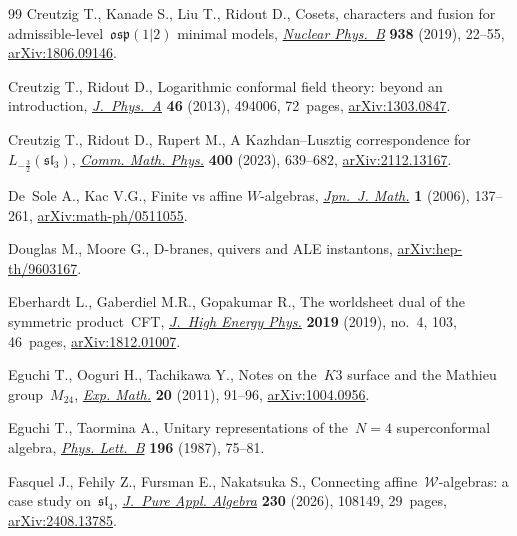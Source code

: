 \begin{thebibliography}{99}
Creutzig T., Kanade S., Liu T., Ridout D., Cosets, characters and fusion for
 admissible-level~{$\mathfrak{osp}(1|2)$} minimal models,
 \href{https://doi.org/10.1016/j.nuclphysb.2018.10.022}{\textit{Nuclear
 Phys.~B}} \textbf{938} (2019), 22--55,
 \href{http://arxiv.org/abs/1806.09146}{arXiv:1806.09146}.

Creutzig T., Ridout D., Logarithmic conformal field theory: beyond an
 introduction,
 \href{https://doi.org/10.1088/1751-8113/46/49/494006}{\textit{J.~Phys.~A}}
 \textbf{46} (2013), 494006, 72~pages,
 \href{http://arxiv.org/abs/1303.0847}{arXiv:1303.0847}.

Creutzig T., Ridout D., Rupert M., A {K}azhdan--{L}usztig correspondence
 for~{$L_{-\frac32}(\mathfrak{sl}_3)$},
 \href{https://doi.org/10.1007/s00220-022-04602-8}{\textit{Comm. Math. Phys.}}
 \textbf{400} (2023), 639--682,
 \href{http://arxiv.org/abs/2112.13167}{arXiv:2112.13167}.

De~Sole A., Kac V.G., Finite vs affine {$W$}-algebras,
 \href{https://doi.org/10.1007/s11537-006-0505-2}{\textit{Jpn.~J. Math.}}
 \textbf{1} (2006), 137--261,
 \href{http://arxiv.org/abs/math-ph/0511055}{arXiv:math-ph/0511055}.

Douglas M., Moore G., D-branes, quivers and {ALE} instantons,
 \href{http://arxiv.org/abs/hep-th/9603167}{arXiv:hep-th/9603167}.

Eberhardt L., Gaberdiel M.R., Gopakumar R., The worldsheet dual of the
 symmetric product~{CFT},
 \href{https://doi.org/10.1007/jhep04(2019)103}{\textit{J.~High Energy Phys.}}
 \textbf{2019} (2019), no.~4, 103, 46~pages,
 \href{http://arxiv.org/abs/1812.01007}{arXiv:1812.01007}.

Eguchi T., Ooguri H., Tachikawa Y., Notes on the~{$K3$} surface and the
 {M}athieu group~{$M_{24}$},
 \href{https://doi.org/10.1080/10586458.2011.544585}{\textit{Exp. Math.}}
 \textbf{20} (2011), 91--96,
 \href{http://arxiv.org/abs/1004.0956}{arXiv:1004.0956}.

Eguchi T., Taormina A., Unitary representations of the~{$N=4$} superconformal
 algebra, \href{https://doi.org/10.1016/0370-2693(87)91679-0}{\textit{Phys.
 Lett.~B}} \textbf{196} (1987), 75--81.

Fasquel J., Fehily Z., Fursman E., Nakatsuka S., Connecting
 affine~{$\mathcal{W}$}-algebras: a case study on~{$\mathfrak{sl}_{4}$},
 \href{https://doi.org/10.1016/j.jpaa.2025.108149}{\textit{J.~Pure Appl.
 Algebra}} \textbf{230} (2026), 108149, 29~pages,
 \href{http://arxiv.org/abs/2408.13785}{arXiv:2408.13785}.


\end{thebibliography}
